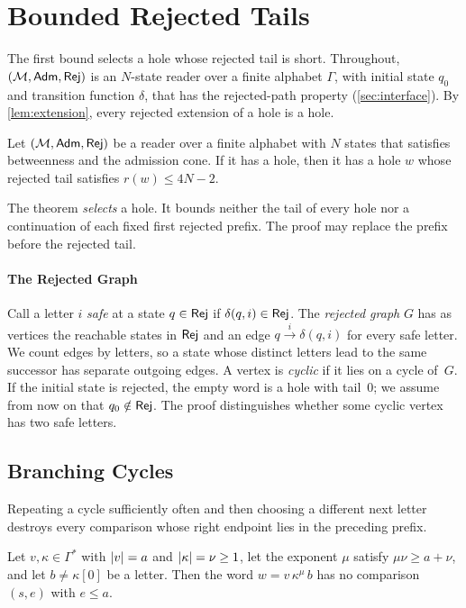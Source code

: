 \section{Bounded Rejected Tails}
\label{sec:tail}

The first bound selects a hole whose rejected tail is short. Throughout,
$(\mathcal M,\mathsf{Adm},\mathsf{Rej})$ is an $N$-state reader over a finite alphabet
$\Gamma$, with initial state $q_0$ and transition function $\delta$,
that has the rejected-path property (\cref{sec:interface}). By
\cref{lem:extension}, every rejected extension of a hole is a hole.

\begin{theorem}\label{thm:brt}
Let $(\mathcal{M},\mathsf{Adm},\mathsf{Rej})$ be a reader over a finite alphabet with $N$ states that satisfies
betweenness and the admission cone. If it has a hole, then it has a hole $w$ whose rejected tail
satisfies $r(w) \le 4N - 2$.
\end{theorem}

The theorem \emph{selects} a hole. It bounds neither the tail of every
hole nor a continuation of each fixed first rejected prefix. The proof
may replace the prefix before the rejected tail.

\paragraph{The Rejected Graph}
Call a letter $i$ \emph{safe} at a state $q \in \mathsf{Rej}$ if $\delta(q,i) \in \mathsf{Rej}$. The
\emph{rejected graph} $G$ has as vertices the reachable states in $\mathsf{Rej}$ and an edge
$q \xrightarrow{i} \delta(q,i)$ for every safe letter. We count edges by letters, so a state
whose distinct letters lead to the same successor has separate outgoing edges. A vertex is
\emph{cyclic} if it lies on a cycle of~$G$. If the initial state is rejected, the empty
word is a hole with tail~$0$; we assume from now on that $q_0 \notin \mathsf{Rej}$. The proof
distinguishes whether some cyclic vertex has two safe letters.

\subsection{Branching Cycles}

Repeating a cycle sufficiently often and then choosing a different next
letter destroys every comparison whose right endpoint lies in the preceding
prefix.

\begin{lemma}[Rotation]\label{lem:rotation}
Let $v, \kappa \in \Gamma^*$ with $\lvert v\rvert = a$ and $\lvert \kappa\rvert = \nu \ge 1$, let the exponent
$\mu$ satisfy $\mu\nu \ge a + \nu$, and let $b \ne \kappa[0]$ be a letter. Then the word
$w = v\,\kappa^\mu\,b$ has no comparison $(s,e)$ with $e \le a$.
\end{lemma}


